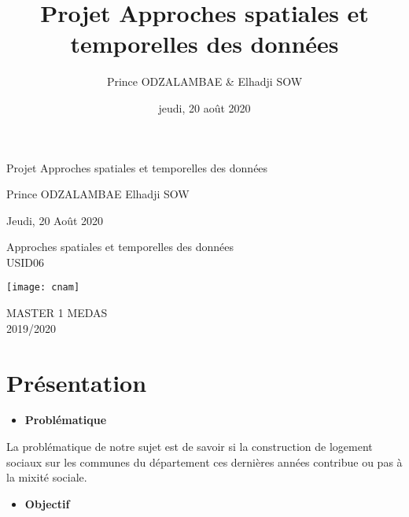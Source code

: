 \documentclass[
  french,
]{article}
\title{Projet Approches spatiales et temporelles des données}
\author{Prince ODZALAMBAE \& Elhadji SOW}
\date{jeudi, 20 août 2020}
\providecommand{\tightlist}{%
  \setlength{\itemsep}{0pt}\setlength{\parskip}{0pt}}
\begin{document}
\maketitle

\thispagestyle{empty}
\begin{center}
	\vspace*{1cm}
	
	\Huge
	\textsf{Projet Approches spatiales et temporelles des données}
	
	\vspace{0.5cm}
	
	\textsf{Prince ODZALAMBAE}
	\textsf{Elhadji SOW}
	
	\vspace{0.5cm}
	\LARGE
	Jeudi, 20 Août 2020
	
	\vfill
	
	Approches spatiales et temporelles des données\\
	USID06
	
	\vspace{1cm}
	
	\texttt{[image: cnam]}
	
	\Large
	MASTER 1 MEDAS\\
	2019/2020
\end{center}

\setlength{\abovedisplayskip}{-5pt}
\setlength{\abovedisplayshortskip}{-5pt}

\newpage

{
\setcounter{tocdepth}{2}
\tableofcontents
}
\newpage

\hypertarget{pruxe9sentation}{%
\section*{Présentation}\label{pruxe9sentation}}

\begin{itemize}
\tightlist
\item
  \textbf{Problématique}
\end{itemize}

La problématique de notre sujet est de savoir si la construction de logement sociaux sur les communes du département ces dernières années contribue ou pas à la mixité sociale.

\begin{itemize}
\tightlist
\item
  \textbf{Objectif}
\end{itemize}
\end{document}
